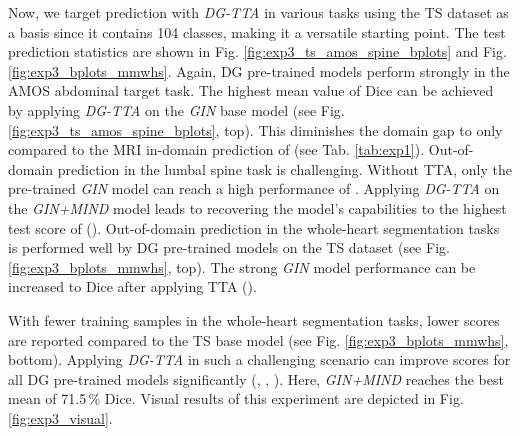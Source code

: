             Now, we target prediction with \emph{DG-TTA} in various tasks using the TS dataset as a basis since it contains 104 classes, making it a versatile starting point. The test prediction statistics are shown in Fig. \ref{fig:exp3_ts_amos_spine_bplots} and Fig. \ref{fig:exp3_bplots_mmwhs}. Again, DG pre-trained models perform strongly in the AMOS abdominal target task. The highest mean value of  Dice can be achieved by applying \emph{DG-TTA} on the \emph{GIN} base model (see Fig. \ref{fig:exp3_ts_amos_spine_bplots}, top). This diminishes the domain gap to only  compared to the MRI in-domain prediction of  (see Tab. \ref{tab:exp1}).
            Out-of-domain prediction in the lumbal spine task  is challenging. Without TTA, only the pre-trained \emph{GIN} model can reach a high performance of . Applying \emph{DG-TTA} on the \emph{GIN+MIND} model leads to recovering the model's capabilities to the highest test score of  ().
            Out-of-domain prediction in the whole-heart segmentation tasks is performed well by DG pre-trained models on the TS dataset (see Fig. \ref{fig:exp3_bplots_mmwhs}, top). The strong \emph{GIN} model performance can be increased to  Dice after applying TTA ().

            With fewer training samples in the  whole-heart segmentation tasks, lower scores are reported compared to the TS base model (see Fig. \ref{fig:exp3_bplots_mmwhs}, bottom). Applying \emph{DG-TTA} in such a challenging scenario can improve scores for all DG pre-trained models significantly (, , ). Here, \emph{GIN+MIND} reaches the best mean of 71.5\,\% Dice.
            Visual results of this experiment are depicted in Fig. \ref{fig:exp3_visual}.



